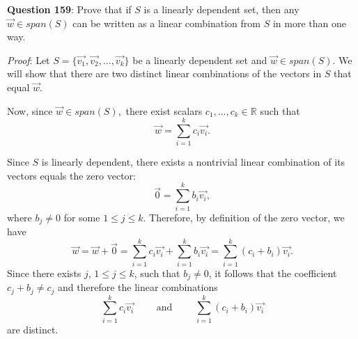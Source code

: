 \documentclass{exam}
\begin{document}
\textbf{Question 159}: Prove that if $S$ is a linearly dependent set, then any $\Vec{w}\in span(S)$ can be written as a linear combination from $S$ in more than one way.\newline
\vspace{0.2in}
\newline

\textit{Proof}: Let $S=\{\Vec{v_1},\Vec{v_2},\ldots,\Vec{v_k}\}$ be a linearly dependent set and $\Vec{w}\in span(S)$. We will show that there are two distinct linear combinations of the vectors in $S$ that equal $\Vec{w}$.

Now, since $\Vec{w}\in span(S),$ there exist scalars $c_1,...,c_k\in\mathbb{R}$ such that $$\Vec{w}=\sum_{i=1}^k c_i\Vec{v_i}.$$

Since $S$ is linearly dependent, there exists a nontrivial linear combination of its vectors equals the zero vector: $$\Vec{0}=\sum_{i=1}^k b_i\Vec{v_i},$$ where $b_j\neq 0$ for some $1\leq j\leq k$. Therefore, by definition of the zero vector, we have $$\Vec{w}=\Vec{w}+\Vec{0}=\sum_{i=1}^k c_i\Vec{v_i} + \sum_{i=1}^k b_i\Vec{v_i}=\sum_{i=1}^k (c_i+b_i)\Vec{v_i}.$$ Since there exists $j$, $1\leq j\leq k$, such that $b_j\neq 0$, it follows that the coefficient $c_j+b_j\neq c_j$ and therefore the linear combinations $$\sum_{i=1}^k c_i\Vec{v_i} \qquad\text{ and }\qquad \sum_{i=1}^k (c_i+b_i)\Vec{v_i}$$ are distinct. \qedsymbol
\end{document}
